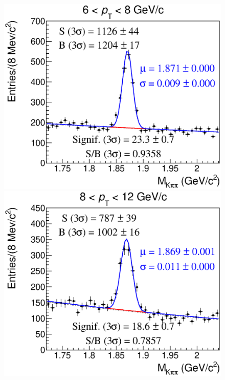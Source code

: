\documentclass[b5paper,10pt,twoside,oldstyle,classica]{toptesi}
\begin{document}
\begin{figure}[h]
\begin{center}
{\includegraphics[scale = 0.25]{MassFitSet2_Pt4.eps}}
\hspace{0cm}
{\includegraphics[scale = 0.25]{MassFitSet2_Pt5.eps}}
\vspace{0cm}

\end{center}
\end{figure}
\end{document}
